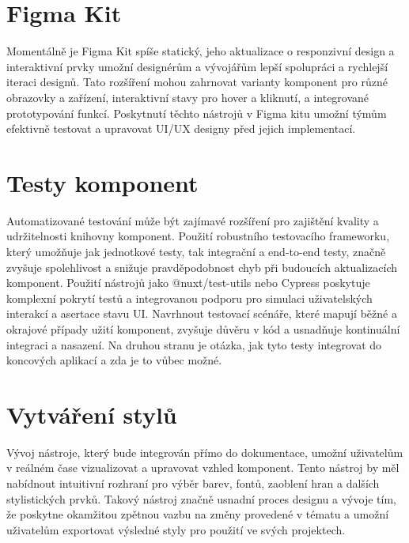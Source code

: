 \section{Figma Kit}
Momentálně je Figma Kit spíše statický, jeho aktualizace o responzivní design a interaktivní prvky umožní designérům a vývojářům lepší spolupráci a rychlejší iteraci designů. Tato rozšíření mohou zahrnovat varianty komponent pro různé obrazovky a zařízení, interaktivní stavy pro hover a kliknutí, a integrované prototypování funkcí. Poskytnutí těchto nástrojů v Figma kitu umožní týmům efektivně testovat a upravovat UI/UX designy před jejich implementací.

\section{Testy komponent}
Automatizované testování může být zajímavé rozšíření pro zajištění kvality a udržitelnosti knihovny komponent. Použití robustního testovacího frameworku, který umožňuje jak jednotkové testy, tak integrační a end-to-end testy, značně zvyšuje spolehlivost a snižuje pravděpodobnost chyb při budoucích aktualizacích komponent. Použití nástrojů jako @nuxt/test-utils nebo Cypress poskytuje komplexní pokrytí testů a integrovanou podporu pro simulaci uživatelských interakcí a asertace stavu UI. Navrhnout testovací scénáře, které mapují běžné a okrajové případy užití komponent, zvyšuje důvěru v kód a usnadňuje kontinuální integraci a nasazení. Na druhou stranu je otázka, jak tyto testy integrovat do koncových aplikací a zda je to vůbec možné.

\section{Vytváření stylů}
Vývoj  nástroje, který bude integrován přímo do dokumentace, umožní uživatelům v reálném čase vizualizovat a upravovat vzhled komponent. Tento nástroj by měl nabídnout intuitivní rozhraní pro výběr barev, fontů, zaoblení hran a dalších stylistických prvků. Takový nástroj značně usnadní proces designu a vývoje tím, že poskytne okamžitou zpětnou vazbu na změny provedené v tématu a umožní uživatelům exportovat výsledné styly pro použití ve svých projektech.

